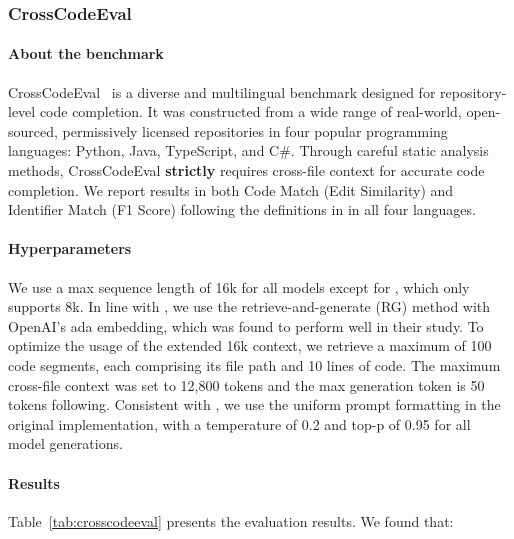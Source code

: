 \documentclass[10pt]{article} %
\begin{document}
\subsubsection{CrossCodeEval}
\paragraph{About the benchmark} CrossCodeEval~\citep{ding2023crosscodeeval} is a diverse and multilingual benchmark designed for repository-level code completion. It was constructed from a wide range of real-world, open-sourced, permissively licensed repositories in four popular programming languages: Python, Java, TypeScript, and C\#. Through careful static analysis methods, CrossCodeEval \textbf{strictly} requires cross-file context for accurate code completion. We report results in both Code Match (Edit Similarity) and Identifier Match (F1 Score) following the definitions in \cite{ding2023crosscodeeval} in all four languages.

\paragraph{Hyperparameters} We use a max sequence length of 16k for all models except for \starcoderbase{}, which only supports 8k. In line with \cite{ding2023crosscodeeval}, we use the retrieve-and-generate (RG) method with OpenAI's ada embedding, which was found to perform well in their study. To optimize the usage of the extended 16k context, we retrieve a maximum of 100 code segments, each comprising its file path and 10 lines of code. The maximum cross-file context was set to 12,800 tokens and the max generation token is 50 tokens following. Consistent with \cite{ding2023crosscodeeval}, we use the uniform prompt formatting in the original implementation, with a temperature of 0.2 and top-p of 0.95 for all model generations.

\paragraph{Results} Table~\ref{tab:crosscodeeval} presents the evaluation results. We found that:
\end{document}
